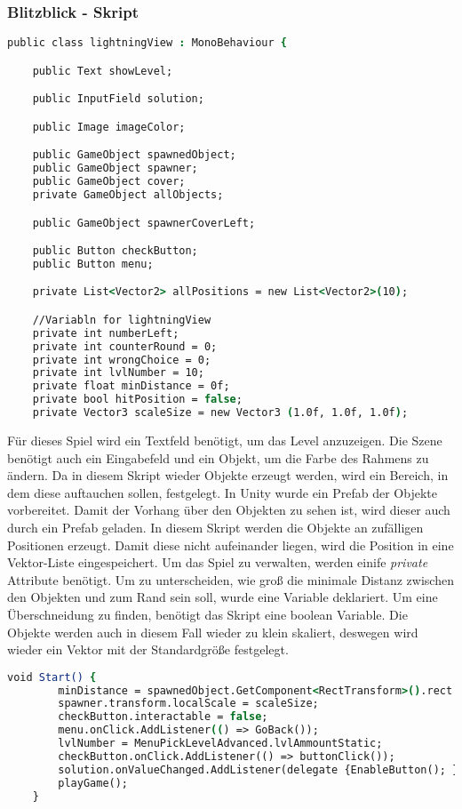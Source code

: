 \subsubsection{Blitzblick - Skript}
\begin{lstlisting}[language=csh, caption={lightningView.cs Variablendeklaration}]
public class lightningView : MonoBehaviour {

	public Text showLevel;

	public InputField solution;

	public Image imageColor;

	public GameObject spawnedObject;
	public GameObject spawner;
	public GameObject cover;
	private GameObject allObjects;

	public GameObject spawnerCoverLeft;

	public Button checkButton;
	public Button menu;

	private List<Vector2> allPositions = new List<Vector2>(10);

	//Variabln for lightningView
	private int numberLeft;
	private int counterRound = 0;
	private int wrongChoice = 0;
	private int lvlNumber = 10;
	private float minDistance = 0f;
	private bool hitPosition = false;
	private Vector3 scaleSize = new Vector3 (1.0f, 1.0f, 1.0f);
\end{lstlisting}
Für dieses Spiel wird ein Textfeld benötigt, um das Level anzuzeigen. Die Szene benötigt auch ein Eingabefeld und ein Objekt, um die Farbe des Rahmens zu ändern. Da in diesem Skript wieder Objekte erzeugt werden, wird ein Bereich, in dem diese auftauchen sollen, festgelegt. In Unity wurde ein Prefab der Objekte vorbereitet. Damit der Vorhang über den Objekten zu sehen ist, wird dieser auch durch ein Prefab geladen. In diesem Skript werden die Objekte an zufälligen Positionen erzeugt. Damit diese nicht aufeinander liegen, wird die Position in eine Vektor-Liste eingespeichert. Um das Spiel zu verwalten, werden einife \textit{private} Attribute benötigt. Um zu unterscheiden, wie groß die minimale Distanz zwischen den Objekten und zum Rand sein soll, wurde eine Variable deklariert. Um eine Überschneidung zu finden, benötigt das Skript eine boolean Variable. Die Objekte werden auch in diesem Fall wieder zu klein skaliert, deswegen wird wieder ein Vektor mit der Standardgröße festgelegt.\\
\begin{lstlisting}[language=csh, caption={lightningView.cs Start-Funktion}]
	void Start() {
		minDistance = spawnedObject.GetComponent<RectTransform>().rect.width / 2;
		spawner.transform.localScale = scaleSize;
		checkButton.interactable = false;
		menu.onClick.AddListener(() => GoBack());
		lvlNumber = MenuPickLevelAdvanced.lvlAmmountStatic;
		checkButton.onClick.AddListener(() => buttonClick());
		solution.onValueChanged.AddListener(delegate {EnableButton(); });
		playGame();
	}
\end{lstlisting}
